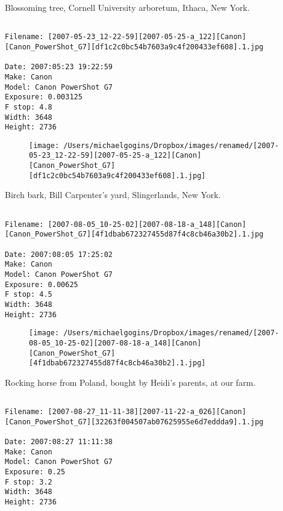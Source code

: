 \documentclass[11pt,letter,DIV=14,paper=landscape]{scrbook}
\begin{document}
\clearpage
\noindent Blossoming tree, Cornell University arboretum, Ithaca, New York.
\noindent
\begin{lstlisting}

Filename: [2007-05-23_12-22-59][2007-05-25-a_122][Canon][Canon_PowerShot_G7][df1c2c0bc54b7603a9c4f200433ef608].1.jpg

Date: 2007:05:23 19:22:59
Make: Canon
Model: Canon PowerShot G7
Exposure: 0.003125
F stop: 4.8
Width: 3648
Height: 2736
\end{lstlisting}
\clearpage

\begin{figure}
\texttt{[image: /Users/michaelgogins/Dropbox/images/renamed/[2007-05-23\_12-22-59][2007-05-25-a\_122][Canon][Canon\_PowerShot\_G7][df1c2c0bc54b7603a9c4f200433ef608].1.jpg]}
\end{figure}
    
\clearpage
\noindent Birch bark, Bill Carpenter's yard, Slingerlands, New York.
\noindent
\begin{lstlisting}

Filename: [2007-08-05_10-25-02][2007-08-18-a_148][Canon][Canon_PowerShot_G7][4f1dbab672327455d87f4c8cb46a30b2].1.jpg

Date: 2007:08:05 17:25:02
Make: Canon
Model: Canon PowerShot G7
Exposure: 0.00625
F stop: 4.5
Width: 3648
Height: 2736
\end{lstlisting}
\clearpage

\begin{figure}
\texttt{[image: /Users/michaelgogins/Dropbox/images/renamed/[2007-08-05\_10-25-02][2007-08-18-a\_148][Canon][Canon\_PowerShot\_G7][4f1dbab672327455d87f4c8cb46a30b2].1.jpg]}
\end{figure}
    
\clearpage
\noindent Rocking horse from Poland, bought by Heidi's parents, at our farm.
\noindent
\begin{lstlisting}

Filename: [2007-08-27_11-11-38][2007-11-22-a_026][Canon][Canon_PowerShot_G7][32263f004507ab07625955e6d7eddda9].1.jpg

Date: 2007:08:27 11:11:38
Make: Canon
Model: Canon PowerShot G7
Exposure: 0.25
F stop: 3.2
Width: 3648
Height: 2736
\end{lstlisting}
\clearpage
\end{document}
